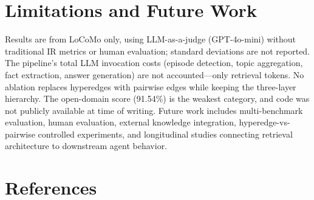 \documentclass[11pt, a4paper]{article}
\begin{document}
\section{Limitations and Future Work}

Results are from LoCoMo only, using LLM-as-a-judge (GPT-4o-mini) without traditional IR metrics or human evaluation; standard deviations are not reported. The pipeline's total LLM invocation costs (episode detection, topic aggregation, fact extraction, answer generation) are not accounted---only retrieval tokens. No ablation replaces hyperedges with pairwise edges while keeping the three-layer hierarchy. The open-domain score (91.54\%) is the weakest category, and code was not publicly available at time of writing. Future work includes multi-benchmark evaluation, human evaluation, external knowledge integration, hyperedge-vs-pairwise controlled experiments, and longitudinal studies connecting retrieval architecture to downstream agent behavior.

\section*{References}
\end{document}
